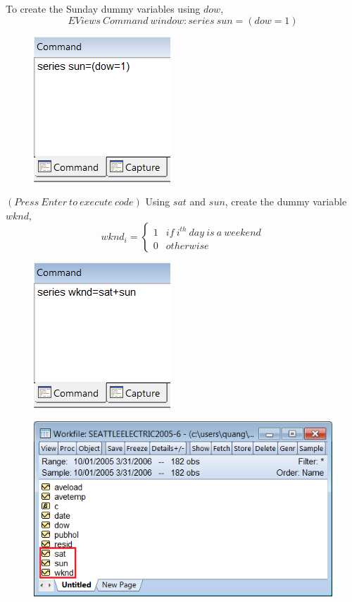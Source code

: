 \documentclass[12pt]{report}
\begin{document}
\justify \noindent To create the Sunday dummy variables using $dow$,
$$EViews\ Command\ window: series\ sun=(dow=1)$$
\begin{figure}[H]
	\centering
	\includegraphics{q1_2}
\end{figure} \vspace{-\baselineskip} \centering $(Press\ Enter\ to\ execute\ code)$
\justify \noindent Using $sat$ and $sun$, create the dummy variable $wknd$,
\begin{equation*}
	wknd_i = \begin{cases}
	1 & if\ i^{th}\ day\ is\ a\ weekend \\
	0 & otherwise
	\end{cases}
\end{equation*}
\begin{figure}[H]
	\centering
	\includegraphics{q1_3}
\end{figure}
\vspace{-\baselineskip}
\begin{figure}[H]
	\centerline{\includegraphics{tute9_1}}
\end{figure}
\end{document}
